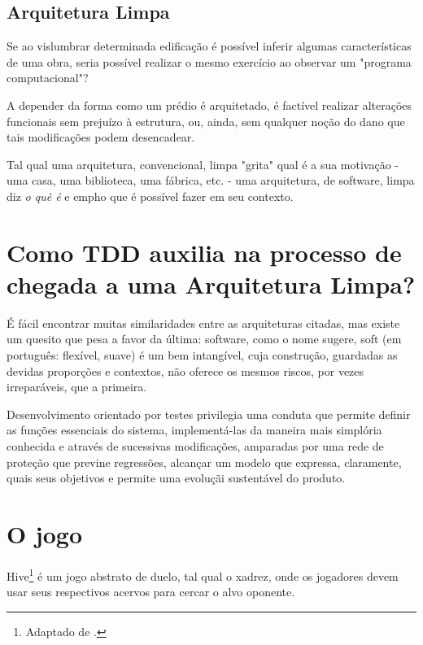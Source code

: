 \documentclass[12pt,a4paper,oneside,english,brazil]{article}
\begin{document}
    \subsection{Arquitetura Limpa}

      Se ao vislumbrar determinada edificação é possível inferir algumas
      características de uma obra, seria possível realizar o mesmo exercício ao
      observar um "programa computacional"?

      A depender da forma como um prédio é arquitetado, é factível realizar
      alterações funcionais sem prejuízo à estrutura, ou, ainda, sem qualquer
      noção do dano que tais modificações podem desencadear.

      Tal qual uma arquitetura, convencional, limpa "grita"\cite[p. 196]{
      Martin2018} qual é a sua motivação - uma casa, uma biblioteca, uma fábrica,
      etc. - uma arquitetura, de software,  limpa diz \emph{o quê é} e emph{o
      que é possível fazer em seu contexto}.

  \section{Como TDD auxilia na processo de chegada a uma Arquitetura Limpa?}

    É fácil encontrar muitas similaridades entre as arquiteturas citadas, mas
    existe um quesito que pesa a favor da última: software, como o nome sugere,
    soft (em português: flexível, suave) é um bem intangível, cuja construção,
    guardadas as devidas proporções e contextos, não oferece os mesmos riscos,
    por vezes irreparáveis, que a primeira.

    Desenvolvimento orientado por testes privilegia uma conduta que permite
    definir as funções essenciais do sistema, implementá-las da maneira mais
    simplória conhecida e através de sucessivas modificações, amparadas por uma
    rede de proteção que previne regressões, alcançar um modelo que expressa,
    claramente, quais seus objetivos e permite uma evoluçãi sustentável do
    produto.

  \section{O jogo}

    Hive\footnote{Adaptado de \cite{UltraBoardGames2020}.} é um jogo
    abstrato de duelo, tal qual o xadrez, onde os jogadores devem usar seus
    respectivos acervos para cercar o alvo oponente.
\end{document}
